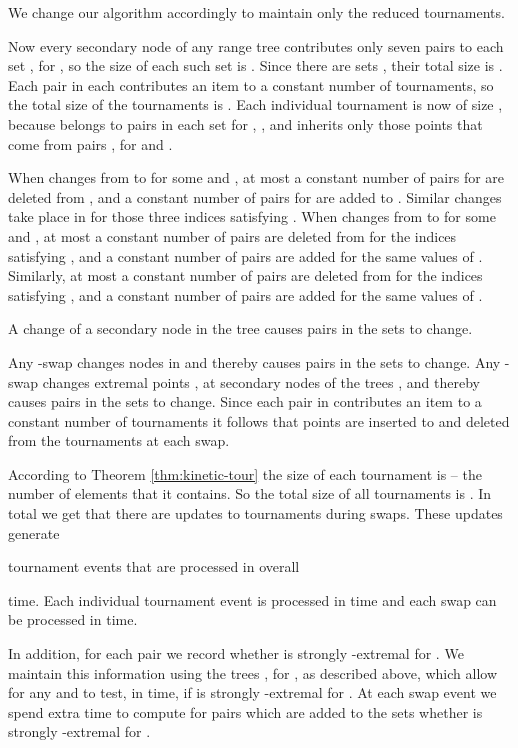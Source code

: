 \documentclass[letter,11pt]{article}
\begin{document}
We change our algorithm accordingly to maintain only the reduced tournaments. 

Now every secondary node  of any range tree  contributes only seven pairs to each set
, for , so the size of each such set is . Since there
are  sets , their total size is .  Each pair in each  contributes an item to a constant
number of tournaments, so the total size of the tournaments is 
.  Each individual tournament  is now
of size , because  belongs to  pairs in each
set  for , , and  inherits only those points  that come from pairs , for  and .

When 
 changes from  to  for some  and , at most a constant number of pairs
 for 
are deleted from , and a constant number of pairs
 for 
are added to .
Similar changes take place in  for those three indices  satisfying
. 
When  
changes from  to  for
some  and ,
at most a constant number of pairs  are deleted
from  for the indices  satisfying , and a constant number of pairs
 are added for the same values of
.  Similarly,
at most a constant number of pairs  are deleted
from  for the indices  satisfying , and a constant number of pairs
 are added for the same values of
.

  A change
of a secondary node  in the tree  causes
  pairs in the sets 
to change.


Any -swap changes 
 nodes in 
   and thereby causes  pairs in the sets 
to change. 
Any -swap changes  extremal points ,
 at secondary nodes  of the trees , and thereby  causes 
  pairs in the sets 
to change. Since each pair in  contributes an item to a constant
number of tournaments it follows that 
 points are inserted to and deleted from
the tournaments  at each swap.


According to Theorem \ref{thm:kinetic-tour}
the size of each tournament is  -- the number
of elements that it contains. So the total size of all tournaments
is . In total we get that there are 
 updates to tournaments during swaps.
These updates generate 
 
tournament events
that are processed in overall
 
time.
Each  individual tournament event 
is processed in  time and each swap
can be processed in  
time.


\smallskip

In addition, for each pair 
we record whether  is strongly
-extremal for .
We maintain this information using the 
trees , for , as described above, which allow
for any  and  to test, in 
time, if  is strongly -extremal for .  At each swap event
we spend  extra time to compute for
 pairs  which are added to the sets 
whether  is strongly
-extremal for .
\end{document}
